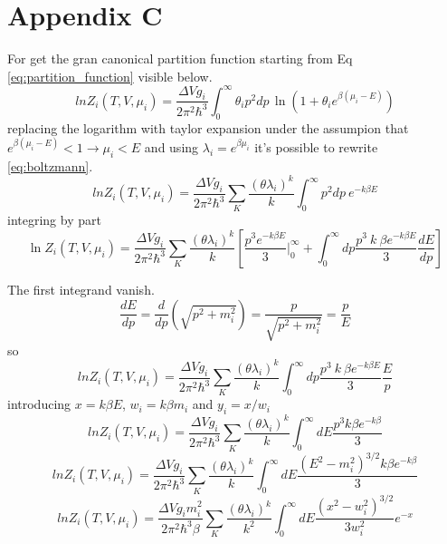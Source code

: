 \documentclass[12pt,a4paper]{book}
\begin{document}
	\section{Appendix C} \label{app:C}
	For get the gran canonical partition function starting from Eq \ref{eq:partition_function} visible below.
	\begin{equation}
		ln Z_i(T,V,\mu_i)= \frac{\Delta V g_i}{2\pi^2\hbar^3} \int_{0}^{\infty} \theta_i p^2 dp \,  \ln(1+\theta_i e^{\beta(\mu_i-E)})
	\end{equation}
	replacing the logarithm with taylor expansion under the assumpion that $e^{\beta(\mu_i-E)} < 1 \rightarrow \mu_i < E$ and using $\lambda_i= e^{\beta \mu_i}$ it's possible to rewrite \ref{eq:boltzmann}.
	\begin{equation}
		ln Z_i(T,V,\mu_i)= \frac{\Delta V g_i}{2\pi^2\hbar^3} \sum_{K} \frac{(\theta \lambda_i)^k}{k} \int_{0}^{\infty} p^2 dp \  e^{-k \beta E}
	\end{equation}
	integring by part
	\begin{equation}
		\ln Z_i(T,V,\mu_i) = \frac{\Delta V g_i}{2\pi^2\hbar^3} \sum_{K} \frac{(\theta \lambda_i)^k}{k} \left[\frac{p^3 e^{-k \beta E}}{3} \Big|_0^\infty + \int_{0}^{\infty} dp \frac{p^3 \  k \  \beta e^{-k \beta E}}{3} \frac{dE}{dp} \right]
	\end{equation}
	
	The first integrand vanish.
	\begin{equation}
		\frac{dE}{dp} = \frac{d}{dp} (\sqrt{p^2+m_i^2}) = \frac{p}{\sqrt{p^2+m_i^2}} = \frac{p}{E}
	\end{equation}
	so
	\begin{equation}
		ln Z_i(T,V,\mu_i)= \frac{\Delta V g_i}{2\pi^2\hbar^3} \sum_{K} \frac{(\theta \lambda_i)^k}{k}  \int_{0}^{\infty} dp \frac{p^3 \  k \  \beta e^{-k \beta E}}{3} \frac{E}{p} 
	\end{equation}
	introducing $x= k\beta E$, $w_i=k\beta m_i$ and $y_i=x/w_i$
	\begin{equation}
		ln Z_i(T,V,\mu_i)= \frac{\Delta V g_i}{2\pi^2\hbar^3} \sum_{K} \frac{(\theta \lambda_i)^k}{k}  \int_{0}^{\infty} dE \frac{p^3 k \beta e^{-k \beta}}{3} 
	\end{equation}
	\begin{equation}
		ln Z_i(T,V,\mu_i)= \frac{\Delta V g_i}{2\pi^2\hbar^3} \sum_{K} \frac{(\theta \lambda_i)^k}{k}  \int_{0}^{\infty} dE \frac{(E^2-m_i^2)^{3/2} k \beta e^{-k \beta}}{3} 
	\end{equation}
	\begin{equation}
		ln Z_i(T,V,\mu_i)= \frac{\Delta V g_i m_i^2}{2\pi^2\hbar^3 \beta} \sum_{K} \frac{(\theta \lambda_i)^k}{k^2}  \int_{0}^{\infty} dE \frac{(x^2-w_i^2)^{3/2}}{3 w_i^2} e^{-x} 
	\end{equation}
	
\end{document}
